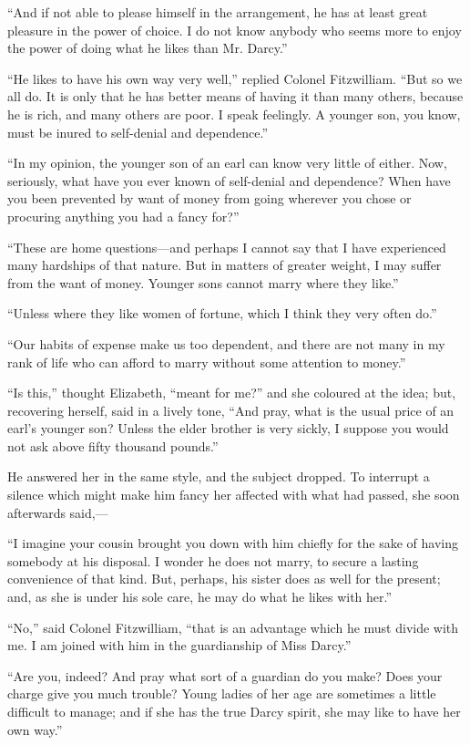 ``And if not able to please himself in the arrangement, he has at least great pleasure in the power of choice. I do not know anybody who seems more to enjoy the power of doing what he likes than Mr. Darcy.''

``He likes to have his own way very well,'' replied Colonel Fitzwilliam. ``But so we all do. It is only that he has better means of having it than many others, because he is rich, and many others are poor. I speak feelingly. A younger son, you know, must be inured to self-denial and dependence.''

``In my opinion, the younger son of an earl can know very little of either. Now, seriously, what have you ever known of self-denial and dependence? When have you been prevented by want of money from going wherever you chose or procuring anything you had a fancy for?''

``These are home questions---and perhaps I cannot say that I have experienced many hardships of that nature. But in matters of greater weight, I may suffer from the want of money. Younger sons cannot marry where they like.''

``Unless where they like women of fortune, which I think they very often do.''

``Our habits of expense make us too dependent, and there are not many in my rank of life who can afford to marry without some attention to money.''

``Is this,'' thought Elizabeth, ``meant for me?'' and she coloured at the idea; but, recovering herself, said in a lively tone, ``And pray, what is the usual price of an earl's younger son? Unless the elder brother is very sickly, I suppose you would not ask above fifty thousand pounds.''

He answered her in the same style, and the subject dropped. To interrupt a silence which might make him fancy her affected with what had passed, she soon afterwards said,---

``I imagine your cousin brought you down with him chiefly for the sake of having somebody at his disposal. I wonder he does not marry, to secure a lasting convenience of that kind. But, perhaps, his sister does as well for the present; and, as she is under his sole care, he may do what he likes with her.''

``No,'' said Colonel Fitzwilliam, ``that is an advantage which he must divide with me. I am joined with him in the guardianship of Miss Darcy.''

``Are you, indeed? And pray what sort of a guardian do you make? Does your charge give you much trouble? Young ladies of her age are sometimes a little difficult to manage; and if she has the true Darcy spirit, she may like to have her own way.''


